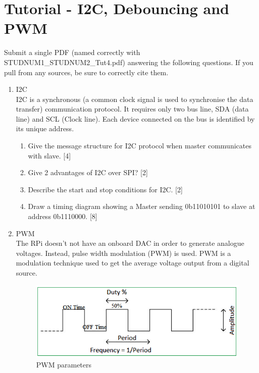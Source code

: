\section{Tutorial - I2C, Debouncing and PWM}



Submit a single PDF (named correctly with STUDNUM1\_STUDNUM2\_Tut4.pdf) answering the following questions. If you pull from any sources, be sure to correctly cite them. 
\begin{enumerate}
    \item I2C\\
    I2C is a synchronous (a common clock signal is used to synchronise the data transfer) communication protocol. It requires only two bus line, SDA (data line) and SCL (Clock line). Each device connected on the bus is identified by its unique address.
    \begin{enumerate}
        \item Give the message structure for I2C protocol when master communicates with slave. [4] 
        \item Give 2 advantages of I2C over SPI? [2]
        \item Describe the start and stop conditions for I2C. [2]
        \item Draw a timing diagram showing a Master sending 0b11010101 to slave at address 0b1110000. [8]
    \end{enumerate}
    \item PWM\\
    The RPi doesn’t not have an onboard DAC in order to generate analogue voltages. Instead,  pulse width modulation (PWM) is used. PWM is a modulation technique used to get the average voltage output from a digital source.
    
            \begin{figure}[H]
            \centering
            \includegraphics[width=0.8\columnwidth]{Figures/PWM.PNG}
            \caption{PWM parameters}
            \label{fig:my_PWM}
        \end{figure}
    

\end{enumerate}
